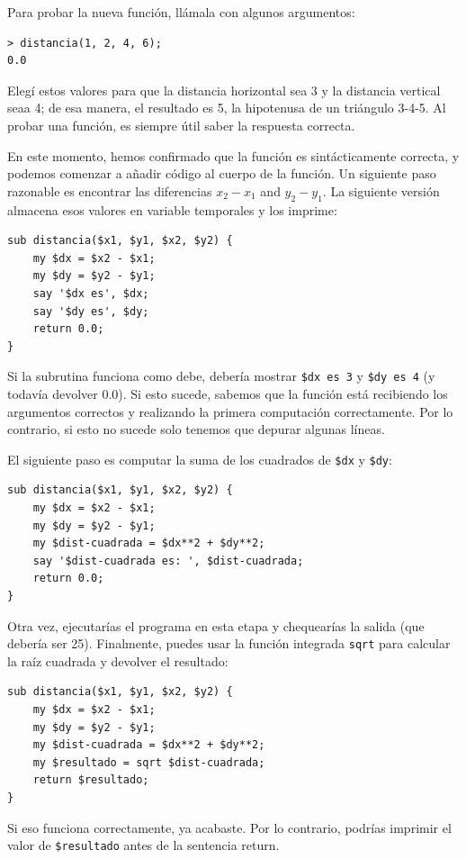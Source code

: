 Para probar la nueva función, llámala con algunos argumentos:

\begin{verbatim}
> distancia(1, 2, 4, 6);
0.0
\end{verbatim}
%
Elegí estos valores para que la distancia horizontal sea 3 y la distancia
vertical seaa 4; de esa manera, el resultado es 5, la hipotenusa de 
un triángulo 3-4-5. Al probar una función, es siempre útil saber la 
respuesta correcta.

En este momento, hemos confirmado que la función es sintácticamente 
correcta, y podemos comenzar a añadir código al cuerpo de
la función. Un siguiente paso razonable es encontrar las diferencias
$x_2 - x_1$ and $y_2 - y_1$.  La siguiente versión almacena esos valores
en variable temporales y los imprime:

\begin{verbatim}
sub distancia($x1, $y1, $x2, $y2) {
    my $dx = $x2 - $x1;
    my $dy = $y2 - $y1;
    say '$dx es', $dx;
    say '$dy es', $dy;
    return 0.0;
}
\end{verbatim}
%
Si la subrutina funciona como debe, debería mostrar \verb"$dx es 3" y 
\verb"$dy es 4" (y todavía devolver 0.0). Si esto sucede, sabemos
que la función está recibiendo los argumentos correctos y realizando
la primera computación correctamente. Por lo contrario, si esto no sucede
solo tenemos que depurar algunas líneas.

El siguiente paso es computar la suma de los cuadrados de {\tt \$dx} y 
{\tt \$dy}:

\begin{verbatim}
sub distancia($x1, $y1, $x2, $y2) {
    my $dx = $x2 - $x1;
    my $dy = $y2 - $y1;
    my $dist-cuadrada = $dx**2 + $dy**2;
    say '$dist-cuadrada es: ', $dist-cuadrada;
    return 0.0;
}
\end{verbatim}
%
Otra vez, ejecutarías el programa en esta etapa y 
chequearías la salida (que debería ser 25).
Finalmente, puedes usar la función integrada {\tt sqrt} 
para calcular la raíz cuadrada y devolver el resultado:

\begin{verbatim}
sub distancia($x1, $y1, $x2, $y2) {
    my $dx = $x2 - $x1;
    my $dy = $y2 - $y1;
    my $dist-cuadrada = $dx**2 + $dy**2;
    my $resultado = sqrt $dist-cuadrada;
    return $resultado;
}
\end{verbatim}
%
Si eso funciona correctamente, ya acabaste. Por lo contrario,
podrías imprimir el valor de {\tt \$resultado} antes de la
sentencia return.

